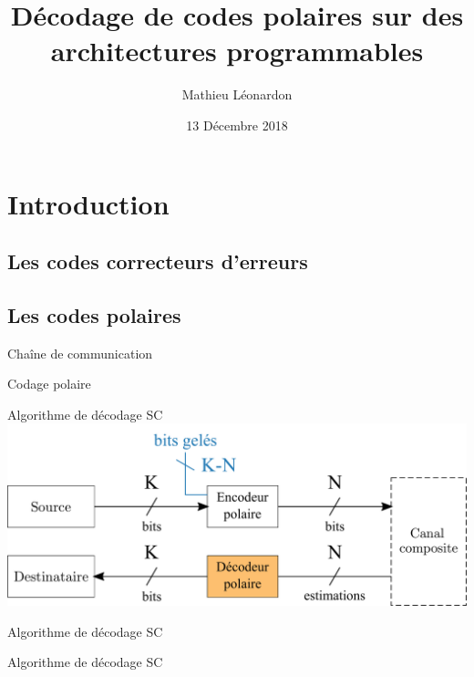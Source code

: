 \documentclass[t,compress,mathserif,12pt,xcolor=dvipsnames]{beamer}
\title{\textbf{Décodage de codes polaires sur des architectures programmables}}
\author[Mathieu Léonardon\hspace{7.51cm}{mathieu.leonardon@ims-bordeaux.fr}]    {Mathieu Léonardon}
\date{13 Décembre 2018}
\begin{document}
\begin{frame}[c]
\titlepage
\end{frame}

\begin{frame}[c]
	\tableofcontents[
	subsectionstyle=hide,
	]
\end{frame}




\section[Introduction]{Introduction}
\subsection{Les codes correcteurs d'erreurs}
\subsection{Les codes polaires}

\begin{frame}[c]{Chaîne de communication}
\end{frame}

\begin{frame}[c]{Codage polaire}
\end{frame}

\begin{frame}[c]{Algorithme de décodage SC}
	\includegraphics[width=.8\textwidth]{fig/decoder_in_chain.pdf}
\end{frame}

\begin{frame}[c]{Algorithme de décodage SC}
\end{frame}

\begin{frame}[c]{Algorithme de décodage SC}
\end{frame}
\end{document}
